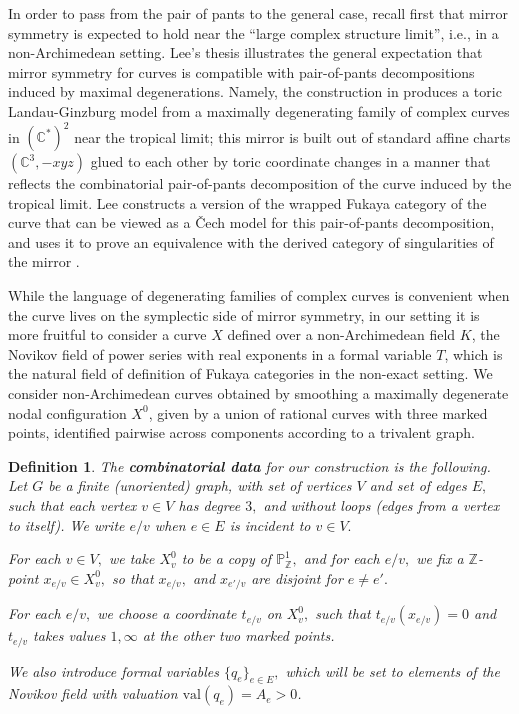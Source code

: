 \documentclass[11pt,leqno]{amsart}
\newtheorem{defi}[theo]{Definition}
\numberwithin{equation}{section}
\def\C{\mathbb{C}}
\def\Z{\mathbb{Z}}
\def\val{\mathrm{val}}
\def\PP{{\mathbb P}}
\begin{document}
In order to pass from the pair of pants to the
general case, recall first that mirror symmetry is expected to hold near
the ``large complex structure limit'', i.e., in a non-Archimedean setting.
Lee's thesis \cite{Lee} illustrates the general expectation that mirror 
symmetry for curves is compatible with 
pair-of-pants decompositions induced by maximal degenerations.
Namely, the construction in \cite{AAK} produces a toric Landau-Ginzburg 
model from a maximally degenerating family of complex curves in $(\C^*)^2$
near the tropical limit; this mirror is built out of standard affine charts 
$(\C^3,-xyz)$ glued to each other by toric coordinate changes in a
manner that reflects the combinatorial pair-of-pants decomposition of the
curve induced by the tropical limit.  Lee constructs a
version of the wrapped Fukaya category of the curve that can be viewed as
a \v Cech model for this pair-of-pants decomposition, and uses it to prove an
equivalence with the derived category of singularities of the mirror
\cite{Lee}. 

While the language of degenerating families of complex curves
is convenient when the curve lives on the symplectic
side of mirror symmetry, in our setting it is more fruitful to consider
a curve $X$ defined over a non-Archimedean field $K$, the
Novikov field of power series with real exponents in a formal
variable $T$, which is the natural field of definition of Fukaya
categories in the non-exact setting. We consider non-Archimedean
curves obtained by smoothing a maximally degenerate nodal configuration
$X^0$, given by a union of rational curves with three marked points, 
identified pairwise across components according to a trivalent graph.

\begin{defi}\label{def:combidata}
The {\bf combinatorial data} for our construction is the following.
Let $G$ be a finite (unoriented) graph, with set of vertices $V$ and 
set of edges $E,$ such that each vertex $v\in V$ has degree $3,$
and without loops (edges from a vertex to itself). We write $e/v$ when $e\in E$ is incident to $v\in V.$

For each $v\in V,$ we take $X^0_{v}$ to be a copy of $\PP^1_{\Z},$ and for each $e/v,$ we fix a $\Z$-point $x_{e/v}\in X^0_{v},$ so that $x_{e/v},$ and $x_{e'/v}$ are disjoint for $e\ne e'.$

For each $e/v,$ we choose a coordinate $t_{e/v}$ on $X_{v}^0,$ such that $t_{e/v}(x_{e/v})=0$ and $t_{e/v}$ takes values $1,\infty$ at the other two marked points. 

We also introduce formal variables $\{q_{e}\}_{e\in E},$ which will be set
to elements of the Novikov field with valuation $\val(q_e)=A_e>0$.
\end{defi}
\end{document}
